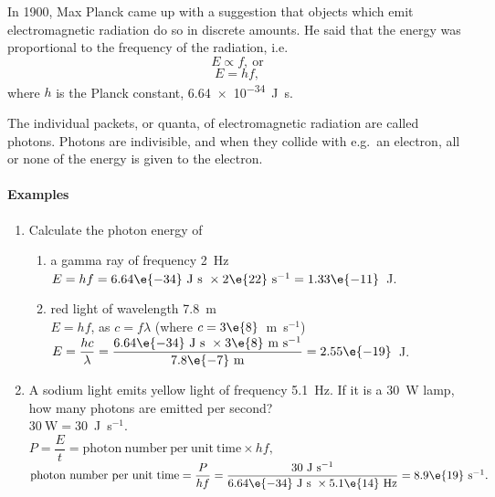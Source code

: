 In 1900, Max Planck came up with a suggestion that objects which emit electromagnetic radiation do so in discrete amounts.  He said that the energy was proportional to the frequency of the radiation, i.e.
\[E\propto f,\mathrm{~or}\]
\[E=hf,\]
where $h$ is the Planck constant, \SI{6.64e-34}{J.s}.

The individual packets, or quanta, of electromagnetic radiation are called photons.  Photons are indivisible, and when they collide with e.g.\ an electron, all or none of the energy is given to the electron.

\paragraph{Examples}

\begin{fullwidth}
\begin{enumerate}
\item Calculate the photon energy of
\begin{enumerate}
\item a gamma ray of frequency 2~Hz\\
$E=hf=6.64\e{-34}~\mathrm{J~s~}\times 2\e{22}~\mathrm{s}^{-1}=1.33\e{-11}$~J.
\item red light of wavelength 7.8~m\\
$E=hf$, as $c=f\lambda$ (where $c=3\e{8}$~m~s$^{-1}$)\\
$E=\dfrac{hc}{\lambda}=\dfrac{6.64\e{-34}~\mathrm{J~s~}\times 3\e{8}~\mathrm{m~s}^{-1}}{7.8\e{-7}~\mathrm{m}}=2.55\e{-19}$~J.
\end{enumerate}
\item A sodium light emits yellow light of frequency 5.1~Hz.  If it is a 30~W lamp, how many photons are emitted per second?\\
$30~\mathrm{W}=30$~J~s$^{-1}.$\\
$P=\dfrac{E}{t}=\mathrm{photon~number~per~unit~time}\times hf,$\\
$\mathrm{photon~number~per~unit~time}=\dfrac{P}{hf}=\dfrac{30~\mathrm{J}~\mathrm{s}^{-1}}{6.64\e{-34}~\mathrm{J~s~}\times 5.1\e{14}~\mathrm{Hz}}=8.9\e{19}~\mathrm{s}^{-1}.$
\end{enumerate}
\end{fullwidth}
